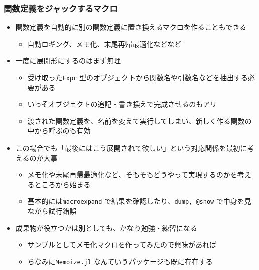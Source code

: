 \begin{frame}[containsverbatim]
\frametitle{関数定義をジャックするマクロ}
\begin{itemize}
  \item 関数定義を自動的に別の関数定義に置き換えるマクロを作ることもできる
  \begin{itemize}
    \item 自動ロギング、メモ化、末尾再帰最適化などなど
  \end{itemize}
  \item 一度に展開形にするのはまず無理
    \begin{itemize}
      \item 受け取った\verb|Expr| 型のオブジェクトから関数名や引数名などを抽出する必要がある
      \item いっそオブジェクトの追記・書き換えで完成させるのもアリ
      \item 渡された関数定義を、名前を変えて実行してしまい、新しく作る関数の中から呼ぶのも有効
    \end{itemize}
  \item この場合でも「最後にはこう展開されて欲しい」という対応関係を最初に考えるのが大事
    \begin{itemize}
      \item メモ化や末尾再帰最適化など、そもそもどうやって実現するのかを考えるところから始まる
      \item 基本的には\verb|macroexpand| で結果を確認したり、\verb|dump, @show| で中身を見ながら試行錯誤 
    \end{itemize}
  \item 成果物が役立つかは別としても、かなり勉強・練習になる
    \begin{itemize}
      \item サンプルとしてメモ化マクロを作ってみたので興味があれば
      \item ちなみに\verb|Memoize.jl| なんていうパッケージも既に存在する
    \end{itemize}
\end{itemize}
\end{frame}

